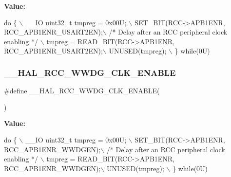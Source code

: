 {\bfseries Value\+:}
\begin{DoxyCode}
\textcolor{keywordflow}{do} \{ \(\backslash\)
                                        \_\_IO uint32\_t tmpreg = 0x00U; \(\backslash\)
                                        SET\_BIT(RCC->APB1ENR, RCC\_APB1ENR\_USART2EN);\(\backslash\)
                                        \textcolor{comment}{/* Delay after an RCC peripheral clock enabling */} \(\backslash\)
                                        tmpreg = READ\_BIT(RCC->APB1ENR, RCC\_APB1ENR\_USART2EN);\(\backslash\)
                                        UNUSED(tmpreg); \(\backslash\)
                                          \} \textcolor{keywordflow}{while}(0U)
\end{DoxyCode}
\mbox{\label{group___r_c_c___a_p_b1___clock___enable___disable_gab0c13cc10b36c32d750be226d2fda3b2}} 
\subsubsection{\texorpdfstring{\+\_\+\+\_\+\+H\+A\+L\+\_\+\+R\+C\+C\+\_\+\+W\+W\+D\+G\+\_\+\+C\+L\+K\+\_\+\+E\+N\+A\+B\+LE}{\_\_HAL\_RCC\_WWDG\_CLK\_ENABLE}}
{\footnotesize\ttfamily \#define \+\_\+\+\_\+\+H\+A\+L\+\_\+\+R\+C\+C\+\_\+\+W\+W\+D\+G\+\_\+\+C\+L\+K\+\_\+\+E\+N\+A\+B\+LE(\begin{DoxyParamCaption}{ }\end{DoxyParamCaption})}

{\bfseries Value\+:}
\begin{DoxyCode}
\textcolor{keywordflow}{do} \{ \(\backslash\)
                                        \_\_IO uint32\_t tmpreg = 0x00U; \(\backslash\)
                                        SET\_BIT(RCC->APB1ENR, RCC\_APB1ENR\_WWDGEN);\(\backslash\)
                                        \textcolor{comment}{/* Delay after an RCC peripheral clock enabling */} \(\backslash\)
                                        tmpreg = READ\_BIT(RCC->APB1ENR, RCC\_APB1ENR\_WWDGEN);\(\backslash\)
                                        UNUSED(tmpreg); \(\backslash\)
                                          \} \textcolor{keywordflow}{while}(0U)
\end{DoxyCode}
